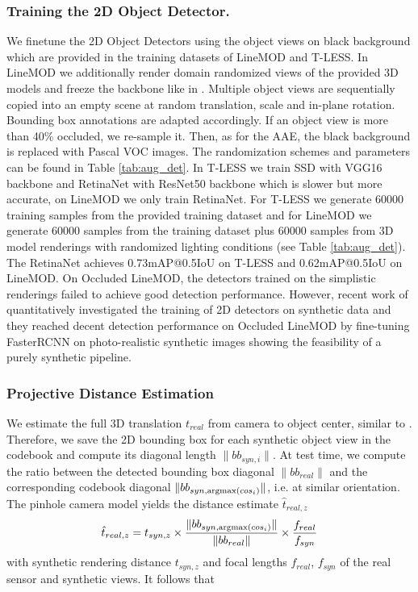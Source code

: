 \subsubsection{Training the 2D Object Detector.} We finetune the 2D Object Detectors using the object views on black background  which are provided in the training datasets of LineMOD and T-LESS. In LineMOD we additionally render domain randomized views of the provided 3D models and freeze the backbone like in \cite{hinterstoisser2017pre}. Multiple object views are sequentially copied into an empty scene at random translation, scale and in-plane rotation. Bounding box annotations are adapted accordingly. If an object view is more than 40\% occluded, we re-sample it. Then, as for the \gls{AAE}, the black background is replaced with Pascal VOC images. The randomization schemes and parameters can be found in Table \ref{tab:aug_det}. In T-LESS we train SSD \citep{liu2016ssd} with VGG16 backbone and RetinaNet \citep{lin2018focal} with ResNet50 backbone which is slower but more accurate, on LineMOD we only train RetinaNet. For T-LESS we generate 60000 training samples from the provided training dataset and for LineMOD we generate 60000 samples from the training dataset plus 60000 samples from 3D model renderings with randomized lighting conditions (see Table \ref{tab:aug_det}). The RetinaNet achieves 0.73mAP@0.5IoU on T-LESS and 0.62mAP@0.5IoU on LineMOD. On Occluded LineMOD, the detectors trained on the simplistic renderings failed to achieve good detection performance. However, recent work of  \cite{Hodan2019PhotorealisticIS} quantitatively investigated the training of 2D detectors on synthetic data and they reached decent detection performance on Occluded LineMOD by fine-tuning FasterRCNN on photo-realistic synthetic images showing the feasibility of a purely synthetic pipeline.

\subsubsection{Projective Distance Estimation}
\label{sec:proj}
We estimate the full 3D translation $t_{real}$ from camera to object center, similar to \cite{kehl2017ssd}. Therefore, we save the 2D bounding box for each synthetic object view in the codebook and compute its diagonal length $\| bb_{syn,i} \|$. At test time, we compute the ratio between the detected bounding box diagonal $\| bb_{real} \|$ and the corresponding codebook diagonal $\| bb_{syn,{\operatorname*{argmax}} (cos_i) }\|$, i.e. at similar orientation. The pinhole camera model yields the distance estimate $\hat{t}_{real,z}$
\begin{equation}
\label{eq:dist}
\hat{t}_{real,z} = t_{syn,z} \times   \frac{\| bb_{syn,{\operatorname*{argmax}} (cos_i)} \|}{\| bb_{real} \|} \times \frac{f_{real}}{f_{syn}}
\end{equation} 
with synthetic rendering distance $t_{syn,z}$ and focal lengths $f_{real}$, $f_{syn}$ of the real sensor and synthetic views. It follows that

